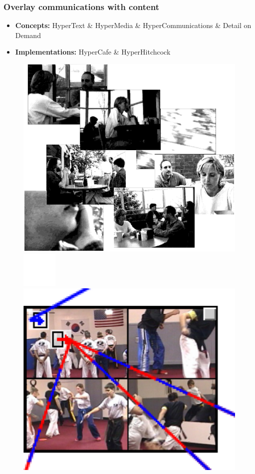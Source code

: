 \documentclass[compress]{beamer}
\begin{document}
  		\begin{frame}[c]
		\frametitle{Overlay communications with content}
		\begin{itemize}
		\item \textbf{Concepts:} HyperText \& HyperMedia \& HyperCommunications \& Detail on  Demand
		\vfill
		\item \textbf{Implementations:} HyperCafe \& HyperHitchcock  %
				
		\end{itemize}
		
		\begin{figure}
			\includegraphics[height=0.4\textheight]{figures/hypercafe.png}
			\includegraphics[height=0.1\textheight]{figures/space.png}
			\includegraphics[height=0.4\textheight]{figures/hitchcock.png}
		\end{figure}
		\end{frame}
\end{document}
